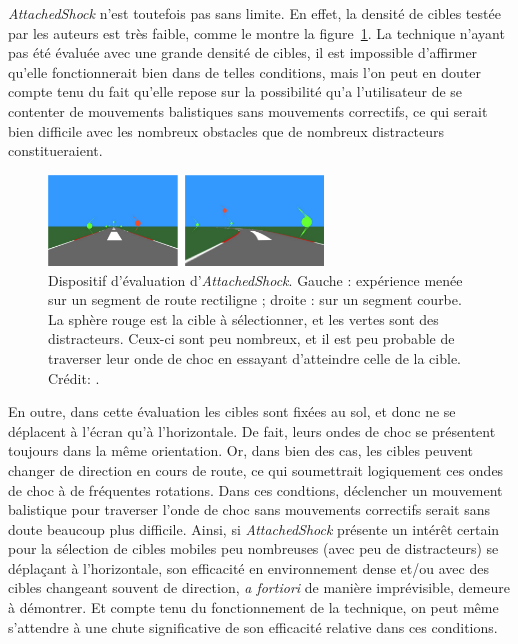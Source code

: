 	\emph{AttachedShock} n'est toutefois pas sans limite. En effet, la densité de cibles testée par les auteurs est très faible, comme le montre la figure~\ref{fig:asDensity}. La technique n'ayant pas été évaluée avec une grande densité de cibles, il est impossible d'affirmer qu'elle fonctionnerait bien dans de telles conditions, mais l'on peut en douter compte tenu du fait qu'elle repose sur la possibilité qu'a l'utilisateur de se \og contenter \fg{} de mouvements balistiques sans mouvements correctifs, ce qui serait bien difficile avec les nombreux obstacles que de nombreux distracteurs constitueraient.
	
	\begin{figure}[!htbp]
		\centering
		\includegraphics[width=0.65\textwidth]{figures/ch2/asDensity}
		\caption[\emph{AttachedShock}, densité de cibles]{Dispositif d'évaluation d'\emph{AttachedShock}. Gauche : expérience menée sur un segment de route rectiligne ; droite : sur un segment courbe. La sphère rouge est la cible à sélectionner, et les vertes sont des distracteurs. Ceux-ci sont peu nombreux, et il est peu probable de \og traverser \fg{} leur onde de choc en essayant d'atteindre celle de la cible. Crédit: \cite{you2012attachedshock}.}
		\label{fig:asDensity}
	\end{figure}
	
	En outre, dans cette évaluation les cibles sont fixées au sol, et donc ne se déplacent à l'écran qu'à l'horizontale. De fait, leurs ondes de choc se présentent toujours dans la même orientation. Or, dans bien des cas, les cibles peuvent changer de direction en cours de route, ce qui soumettrait logiquement ces ondes de choc à de fréquentes rotations. Dans ces condtions, déclencher un mouvement balistique pour traverser l'onde de choc sans mouvements correctifs serait sans doute beaucoup plus difficile.	Ainsi, si \emph{AttachedShock} présente un intérêt certain pour la sélection de cibles mobiles peu nombreuses (avec peu de distracteurs) se déplaçant à l'horizontale, son efficacité en environnement dense et/ou avec des cibles changeant souvent de direction, \emph{a fortiori} de manière imprévisible, demeure à démontrer. Et compte tenu du fonctionnement de la technique, on peut même s'attendre à une chute significative de son efficacité relative dans ces conditions.	
	
